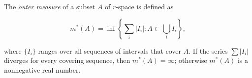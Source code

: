 The \textit{outer measure} of a subset $A$ of $r$-space is defined as

$$
m^*(A) = \inf \left\{ \sum_i |I_i| : A \subset \bigcup_i I_i \right\},
$$

where $\{I_i\}$ ranges over all sequences of intervals that cover $A$. If the series $\sum |I_i|$ diverges for every covering sequence, then $m^*(A) = \infty$; otherwise $m^*(A)$ is a nonnegative real number.

